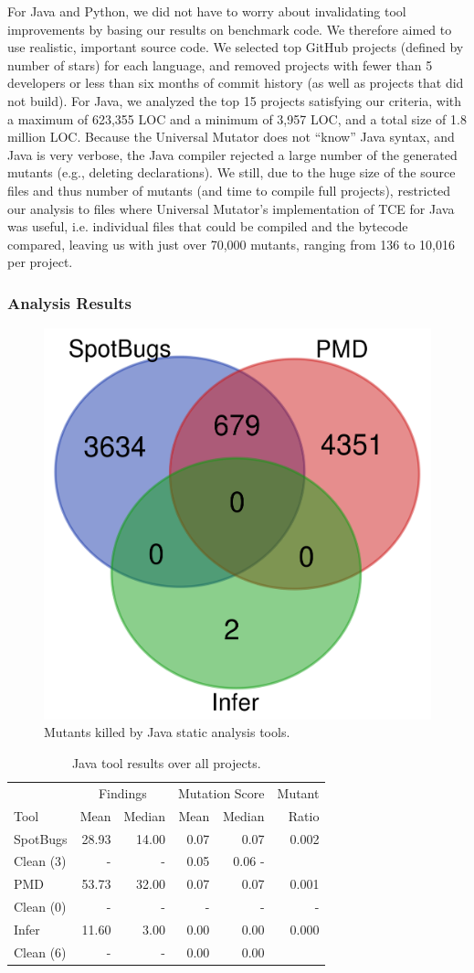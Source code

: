 For Java and Python, we did not have to worry about invalidating tool improvements by basing our results on benchmark code.  We therefore aimed to use realistic, important source code.  We selected top GitHub projects (defined by number of stars) for each language, and removed projects with fewer than 5 developers or less than six months of commit history (as well as projects that did not build).  For Java, we analyzed the top 15 projects satisfying our criteria, with a maximum of 623,355 LOC and a minimum of 3,957 LOC, and a total size of 1.8 million LOC.  Because the Universal Mutator does not ``know'' Java syntax, and Java is very verbose, the Java compiler rejected a large number of the generated mutants (e.g., deleting declarations).  We still, due to the huge size of the source files and thus number of mutants (and time to compile full projects), restricted our analysis to files where Universal Mutator's implementation of TCE \cite{TCE} for Java was useful, i.e. individual files that could be compiled and the bytecode compared, leaving us with just over 70,000 mutants, ranging from 136 to 10,016 per project.

\subsubsection{Analysis Results}


\begin{figure}
  \centering
  \includegraphics[width=0.30\columnwidth]{java.png}
  \caption{Mutants killed by Java static analysis tools.}
  \label{fig:javavenn}
\end{figure}

\begin{table}
  \begin{tabular}{l|r|r|r|r|r}
    & \multicolumn{2}{|c|}{Findings} & \multicolumn{2}{|c|}{Mutation Score}  & Mutant \\
    Tool & Mean & Median & Mean & Median & Ratio\\
    \hline
    \hline
    SpotBugs & 28.93 & 14.00 & 0.07 & 0.07 & 0.002 \\
    Clean (3) & - & - & 0.05 & 0.06 - \\
    \hline
    PMD & 53.73 & 32.00 & 0.07 & 0.07 & 0.001 \\
    Clean (0) & - & - & - & - & - \\
    \hline
    Infer & 11.60 & 3.00 & 0.00 & 0.00 &  0.000 \\
    Clean (6) & - & - & 0.00 & 0.00 \\
    \hline
  \end{tabular}
  \caption{Java tool results over all projects.}
  \label{tab:scorejava}
\end{table}




